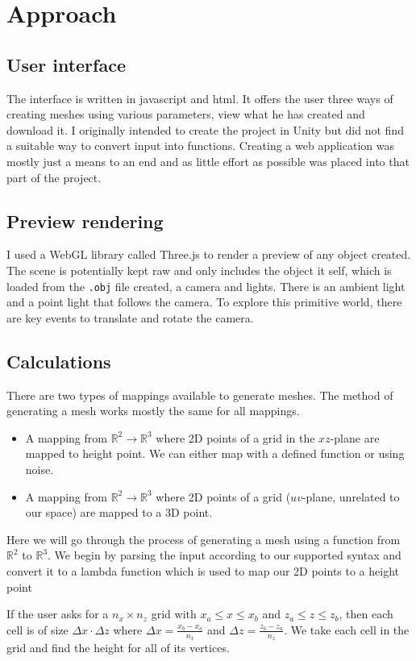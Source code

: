 \documentclass{acmsiggraph}
\newcommand{\R}{\mathbb{R}} %
\begin{document}
\section{Approach}
\subsection{User interface}
The interface is written in javascript and html. It offers the user three ways of creating meshes using various parameters, view what he has created and download it. I originally intended to create the project in Unity but did not find a suitable way to convert input into functions. Creating a web application was mostly just a means to an end and as little effort as possible was placed into that part of the project.

\subsection{Preview rendering}
I used a WebGL library called Three.js to render a preview of any object created. The scene is potentially kept raw and only includes the object it self, which is loaded from the \texttt{.obj} file created, a camera and lights. There is an ambient light and a point light that follows the camera. To explore this primitive world, there are key events to translate and rotate the camera.

\subsection{Calculations}
There are two types of mappings available to generate meshes. The method of generating a mesh works mostly the same for all mappings.
\begin{itemize}
\item A mapping from $\R^2 \to \R^3$ where 2D points of a grid in the $xz$-plane are mapped to height point. We can either map with a defined function or using noise.
\item A mapping from $\R^2 \to \R^3$ where 2D points of a grid ($uv$-plane, unrelated to our space) are mapped to a 3D point.
\end{itemize} 
Here we will go through the process of generating a mesh using a function from $\R^2$ to $\R^3$. We begin by parsing the input according to our supported syntax and convert it to a lambda function which is used to map our 2D points to a height point

If the user asks for a $n_x \times n_z$ grid with $x_a \leq x \leq x_b$ and $z_a \leq z \leq z_b$, then each cell is of size $\Delta x \cdot \Delta z$ where $\Delta x = \frac{x_b-x_a}{n_x}$ and $\Delta z = \frac{z_b-z_a}{n_z}$. We take each cell in the grid and find the height for all of its vertices.
\end{document}

